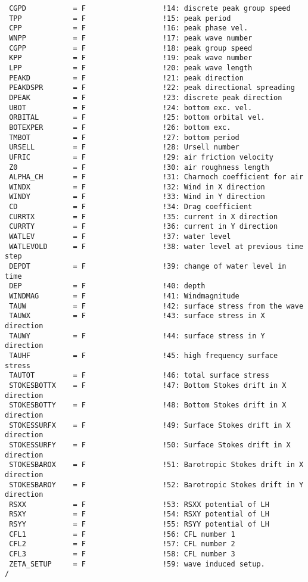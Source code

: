 \documentclass[12pt]{amsart}
\begin{document}
\begin{verbatim}
 CGPD           = F                  !14: discrete peak group speed
 TPP            = F                  !15: peak period  
 CPP            = F                  !16: peak phase vel. 
 WNPP           = F                  !17: peak wave number
 CGPP           = F                  !18: peak group speed
 KPP            = F                  !19: peak wave number
 LPP            = F                  !20: peak wave length 
 PEAKD          = F                  !21: peak direction
 PEAKDSPR       = F                  !22: peak directional spreading
 DPEAK          = F                  !23: discrete peak direction 
 UBOT           = F                  !24: bottom exc. vel. 
 ORBITAL        = F                  !25: bottom orbital vel. 
 BOTEXPER       = F                  !26: bottom exc.  
 TMBOT          = F                  !27: bottom period 
 URSELL         = F                  !28: Ursell number
 UFRIC          = F                  !29: air friction velocity
 Z0             = F                  !30: air roughness length
 ALPHA_CH       = F                  !31: Charnoch coefficient for air
 WINDX          = F                  !32: Wind in X direction
 WINDY          = F                  !33: Wind in Y direction
 CD             = F                  !34: Drag coefficient
 CURRTX         = F                  !35: current in X direction
 CURRTY         = F                  !36: current in Y direction
 WATLEV         = F                  !37: water level
 WATLEVOLD      = F                  !38: water level at previous time step
 DEPDT          = F                  !39: change of water level in time
 DEP            = F                  !40: depth
 WINDMAG        = F                  !41: Windmagnitude
 TAUW           = F                  !42: surface stress from the wave
 TAUWX          = F                  !43: surface stress in X direction
 TAUWY          = F                  !44: surface stress in Y direction
 TAUHF          = F                  !45: high frequency surface stress
 TAUTOT         = F                  !46: total surface stress
 STOKESBOTTX    = F                  !47: Bottom Stokes drift in X direction
 STOKESBOTTY    = F                  !48: Bottom Stokes drift in X direction
 STOKESSURFX    = F                  !49: Surface Stokes drift in X direction
 STOKESSURFY    = F                  !50: Surface Stokes drift in X direction
 STOKESBAROX    = F                  !51: Barotropic Stokes drift in X direction
 STOKESBAROY    = F                  !52: Barotropic Stokes drift in Y direction
 RSXX           = F                  !53: RSXX potential of LH
 RSXY           = F                  !54: RSXY potential of LH
 RSYY           = F                  !55: RSYY potential of LH
 CFL1           = F                  !56: CFL number 1
 CFL2           = F                  !57: CFL number 2
 CFL3           = F                  !58: CFL number 3
 ZETA_SETUP     = F                  !59: wave induced setup.
/
\end{verbatim}
\end{document}
